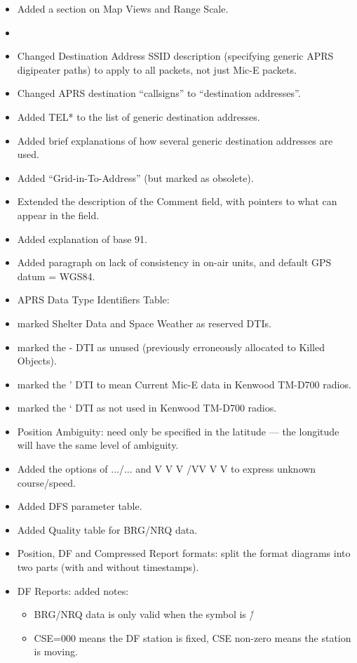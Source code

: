 \begin{itemize}
\item Added a section on Map Views and Range Scale.
\item 
\item   Changed Destination Address SSID description (specifying generic APRS digipeater paths) to apply to all packets, not just Mic-E packets.
\item Changed APRS destination “callsigns” to “destination addresses”.
\item Added TEL* to the list of generic destination addresses.
\item Added brief explanations of how several generic destination addresses are used.
\item Added “Grid-in-To-Address” (but marked as obsolete).
\item Extended the description of the Comment field, with pointers to what can appear in the field.
\item Added explanation of base 91.
\item Added paragraph on lack of consistency in on-air units, and default GPS datum = WGS84.
\item APRS Data Type Identifiers Table:
\item marked Shelter Data and Space Weather as reserved DTIs.
\item marked the - DTI as unused (previously erroneously allocated to Killed Objects).
\item marked the ' DTI to mean Current Mic-E data in Kenwood TM-D700 radios.
\item marked the ‘ DTI as not used in Kenwood TM-D700 radios.
\item Position Ambiguity: need only be specified in the latitude — the longitude will have the same
level of ambiguity.
\item Added the options of .../... and V V V /VV V V to express unknown course/speed.
\item Added DFS parameter table.
\item Added Quality table for BRG/NRQ data.
\item Position, DF and Compressed Report formats: split the format diagrams into two parts (with
and without timestamps).
\item DF Reports: added notes:
\begin{itemize}
\item   BRG/NRQ data is only valid when the symbol is /\.
\item CSE=000 means the DF station is fixed, CSE non-zero means the station is moving.

\end{itemize}
\end{itemize}
